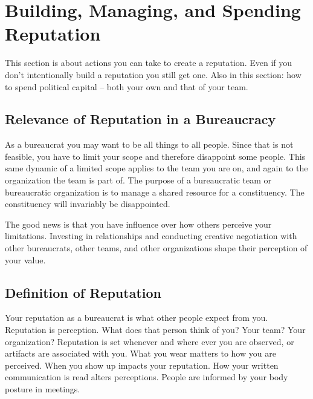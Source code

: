 \section{Building, Managing, and Spending Reputation\label{sec:reputation}}




This section is about actions you can take to create a reputation. Even if you don't intentionally build a reputation you still get one. Also in this section: how to spend political capital -- both your own and that of your team. 

\subsection*{Relevance of Reputation in a Bureaucracy}

As a bureaucrat you may want to be all things to all people. Since that is not feasible, you have to limit your scope and therefore disappoint some people. This same dynamic of a limited scope applies to the team you are on, and again to the organization the team is part of. The purpose of a bureaucratic team or bureaucratic organization is to manage a shared resource for a constituency. The constituency will invariably be disappointed. 

The good news is that you have influence over how others perceive your limitations. Investing in relationships and conducting creative negotiation with other bureaucrats, other teams, and other organizations shape their perception of your value. 

\subsection*{Definition of Reputation}

Your \gls{reputation} as a bureaucrat is what other people expect from you.
Reputation is perception. What does that person think of you? Your team? Your organization? 
Reputation is set whenever and where ever you are observed, or artifacts are associated with you. 
What you wear matters to how you are perceived. When you show up impacts your reputation. How your written communication is read alters perceptions. People are informed by your body posture in meetings. 

